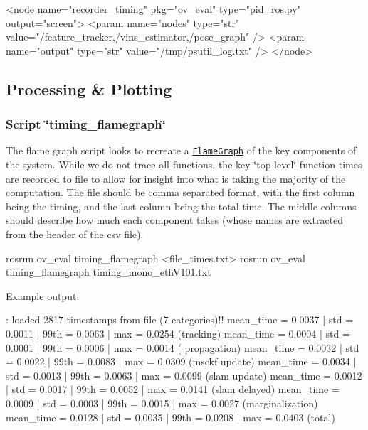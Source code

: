 \begin{DoxyCode}
<\textcolor{keywordtype}{node} \textcolor{keyword}{name}=\textcolor{stringliteral}{"recorder\_timing"} \textcolor{keyword}{pkg}=\textcolor{stringliteral}{"ov\_eval"} \textcolor{keyword}{type}=\textcolor{stringliteral}{"pid\_ros.py"} \textcolor{keyword}{output}=\textcolor{stringliteral}{"screen"}>
    <\textcolor{keywordtype}{param} \textcolor{keyword}{name}=\textcolor{stringliteral}{"nodes"}   \textcolor{keyword}{type}=\textcolor{stringliteral}{"str"} \textcolor{keyword}{value}=\textcolor{stringliteral}{"/feature\_tracker,/vins\_estimator,/pose\_graph"} />
    <\textcolor{keywordtype}{param} \textcolor{keyword}{name}=\textcolor{stringliteral}{"output"}  \textcolor{keyword}{type}=\textcolor{stringliteral}{"str"} \textcolor{keyword}{value}=\textcolor{stringliteral}{"/tmp/psutil\_log.txt"} />
</\textcolor{keywordtype}{node}>
\end{DoxyCode}
\hypertarget{eval-timing_eval-ov-timing-plot}{}\subsection{Processing \& Plotting}\label{eval-timing_eval-ov-timing-plot}
\hypertarget{eval-timing_eval-ov-timing-flame}{}\subsubsection{Script \char`\"{}timing\+\_\+flamegraph\char`\"{}}\label{eval-timing_eval-ov-timing-flame}
The flame graph script looks to recreate a \href{https://github.com/brendangregg/FlameGraph}{\tt Flame\+Graph} of the key components of the system. While we do not trace all functions, the key \char`\"{}top level\char`\"{} function times are recorded to file to allow for insight into what is taking the majority of the computation. The file should be comma separated format, with the first column being the timing, and the last column being the total time. The middle columns should describe how much each component takes (whose names are extracted from the header of the csv file).


\begin{DoxyCode}
rosrun ov\_eval timing\_flamegraph <file\_times.txt>
rosrun ov\_eval timing\_flamegraph timing\_mono\_ethV101.txt
\end{DoxyCode}


Example output\+:


\begin{DoxyCode}
[TIME]: loaded 2817 timestamps from file (7 categories)!!
mean\_time = 0.0037 | std = 0.0011 | 99th = 0.0063  | max = 0.0254 (tracking)
mean\_time = 0.0004 | std = 0.0001 | 99th = 0.0006  | max = 0.0014 ( propagation)
mean\_time = 0.0032 | std = 0.0022 | 99th = 0.0083  | max = 0.0309 (msckf update)
mean\_time = 0.0034 | std = 0.0013 | 99th = 0.0063  | max = 0.0099 (slam update)
mean\_time = 0.0012 | std = 0.0017 | 99th = 0.0052  | max = 0.0141 (slam delayed)
mean\_time = 0.0009 | std = 0.0003 | 99th = 0.0015  | max = 0.0027 (marginalization)
mean\_time = 0.0128 | std = 0.0035 | 99th = 0.0208  | max = 0.0403 (total)
\end{DoxyCode}


